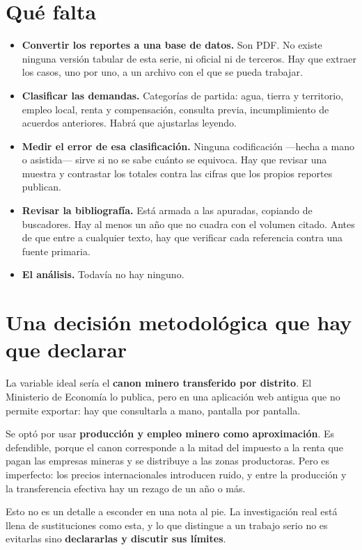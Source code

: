 \documentclass[11pt,a4paper]{article}
\newcommand{\pendiente}{\textcolor{gris}{$\square$}}
\begin{document}
\section{Qué falta}

\begin{itemize}[label=\pendiente]
  \item \textbf{Convertir los reportes a una base de datos.} Son PDF. No existe
  ninguna versión tabular de esta serie, ni oficial ni de terceros. Hay que
  extraer los casos, uno por uno, a un archivo con el que se pueda trabajar.
  \item \textbf{Clasificar las demandas.} Categorías de partida: agua, tierra y
  territorio, empleo local, renta y compensación, consulta previa,
  incumplimiento de acuerdos anteriores. Habrá que ajustarlas leyendo.
  \item \textbf{Medir el error de esa clasificación.} Ninguna codificación
  —hecha a mano o asistida— sirve si no se sabe cuánto se equivoca. Hay que
  revisar una muestra y contrastar los totales contra las cifras que los propios
  reportes publican.
  \item \textbf{Revisar la bibliografía.} Está armada a las apuradas, copiando de
  buscadores. Hay al menos un año que no cuadra con el volumen citado. Antes de
  que entre a cualquier texto, hay que verificar cada referencia contra una
  fuente primaria.
  \item \textbf{El análisis.} Todavía no hay ninguno.
\end{itemize}

\section{Una decisión metodológica que hay que declarar}

La variable ideal sería el \textbf{canon minero transferido por distrito}. El
Ministerio de Economía lo publica, pero en una aplicación web antigua que no
permite exportar: hay que consultarla a mano, pantalla por pantalla.

Se optó por usar \textbf{producción y empleo minero como aproximación}. Es
defendible, porque el canon corresponde a la mitad del impuesto a la renta que
pagan las empresas mineras y se distribuye a las zonas productoras. Pero es
imperfecto: los precios internacionales introducen ruido, y entre la producción y
la transferencia efectiva hay un rezago de un año o más.

Esto no es un detalle a esconder en una nota al pie. La investigación real está
llena de sustituciones como esta, y lo que distingue a un trabajo serio no es
evitarlas sino \textbf{declararlas y discutir sus límites}.
\end{document}
